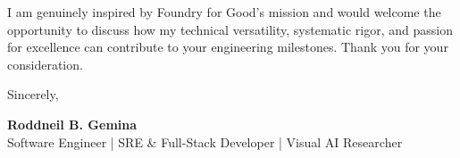 \documentclass[letterpaper,11pt]{article}
\begin{document}
I am genuinely inspired by Foundry for Good's mission and would welcome the opportunity to discuss how my technical versatility, systematic rigor, and passion for excellence can contribute to your engineering milestones. Thank you for your consideration.

Sincerely,

\vspace{12pt}
\textbf{Roddneil B. Gemina} \\
Software Engineer | SRE \& Full-Stack Developer | Visual AI Researcher
\end{document}
